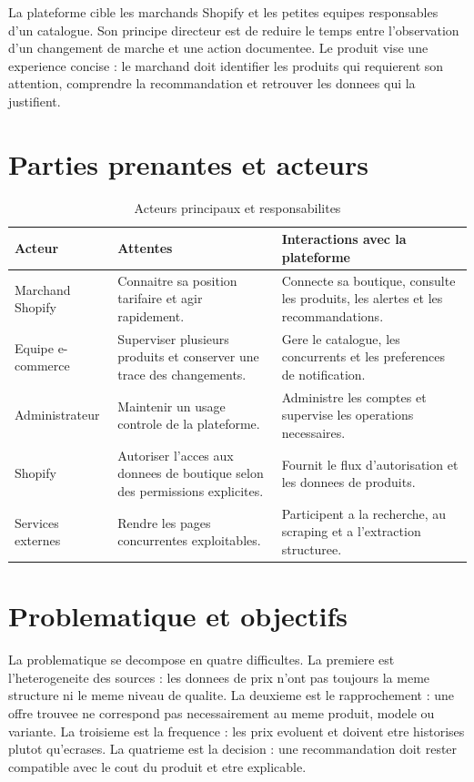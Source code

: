 \documentclass[12pt,a4paper,oneside]{report}
\begin{document}
La plateforme cible les marchands Shopify et les petites equipes responsables d'un catalogue. Son principe directeur est de reduire le temps entre l'observation d'un changement de marche et une action documentee. Le produit vise une experience concise : le marchand doit identifier les produits qui requierent son attention, comprendre la recommandation et retrouver les donnees qui la justifient.

\section{Parties prenantes et acteurs}
\begin{table}[H]
\centering
\caption{Acteurs principaux et responsabilites}
\label{tab:actors}
\begin{tabularx}{\textwidth}{p{}Y Y}
\toprule
\textbf{Acteur} & \textbf{Attentes} & \textbf{Interactions avec la plateforme} \\
\midrule
Marchand Shopify & Connaitre sa position tarifaire et agir rapidement. & Connecte sa boutique, consulte les produits, les alertes et les recommandations. \\
Equipe e-commerce & Superviser plusieurs produits et conserver une trace des changements. & Gere le catalogue, les concurrents et les preferences de notification. \\
Administrateur & Maintenir un usage controle de la plateforme. & Administre les comptes et supervise les operations necessaires. \\
Shopify & Autoriser l'acces aux donnees de boutique selon des permissions explicites. & Fournit le flux d'autorisation et les donnees de produits. \\
Services externes & Rendre les pages concurrentes exploitables. & Participent a la recherche, au scraping et a l'extraction structuree. \\
\bottomrule
\end{tabularx}
\end{table}

\section{Problematique et objectifs}
La problematique se decompose en quatre difficultes. La premiere est l'heterogeneite des sources : les donnees de prix n'ont pas toujours la meme structure ni le meme niveau de qualite. La deuxieme est le rapprochement : une offre trouvee ne correspond pas necessairement au meme produit, modele ou variante. La troisieme est la frequence : les prix evoluent et doivent etre historises plutot qu'ecrases. La quatrieme est la decision : une recommandation doit rester compatible avec le cout du produit et etre explicable.
\end{document}
